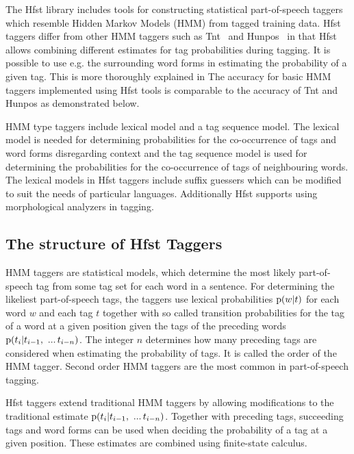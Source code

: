 \documentclass{llncs}
\begin{document}
The Hfst library includes tools for constructing statistical
 part-of-speech taggers which resemble Hidden Markov Models (HMM) from
 tagged training data. Hfst taggers differ from other HMM taggers such
 as Tnt~\cite{Brants:2000} and Hunpos~\cite{Halascy:2007} in that Hfst
 allows combining different estimates for tag probabilities during
 tagging. It is possible to use e.g. the surrounding word forms in
 estimating the probability of a given tag. This is more thoroughly
 explained in \cite{Silfverberg/2010/IceTal,Silfverberg/2011} The
 accuracy for basic HMM taggers implemented using Hfst tools is
 comparable to the accuracy of Tnt and Hunpos as demonstrated below.

HMM type taggers include lexical model and a tag sequence model. The
 lexical model is needed for determining probabilities for the
 co-occurrence of tags and word forms disregarding context and the tag
 sequence model is used for determining the probabilities for the
 co-occurrence of tags of neighbouring words. The lexical models in
 Hfst taggers include suffix guessers which can be modified to suit
 the needs of particular languages. Additionally Hfst supports using
 morphological analyzers in tagging.

\subsection{The structure of Hfst Taggers}

HMM taggers are statistical models, which determine the most likely
 part-of-speech tag from some tag set for each word in a sentence. For
 determining the likeliest part-of-speech tags, the taggers use
 lexical probabilities ${\rm p}(w|t)$ for each word $w$ and each tag
 $t$ together with so called transition probabilities for the tag of a
 word at a given position given the tags of the preceding words ${\rm
 p}(t_i | t_{i - 1},\ ...\, t_{i-n})$. The integer $n$ determines how
 many preceding tags are considered when estimating the probability of
 tags. It is called the order of the HMM tagger. Second order HMM
 taggers are the most common in part-of-speech tagging.

Hfst taggers extend traditional HMM taggers by allowing modifications
 to the traditional estimate ${\rm p}(t_i | t_{i - 1},\ ...\,
 t_{i-n})$. Together with preceding tags, succeeding tags and word
 forms can be used when deciding the probability of a tag at a given
 position. These estimates are combined using finite-state calculus.
\end{document}
